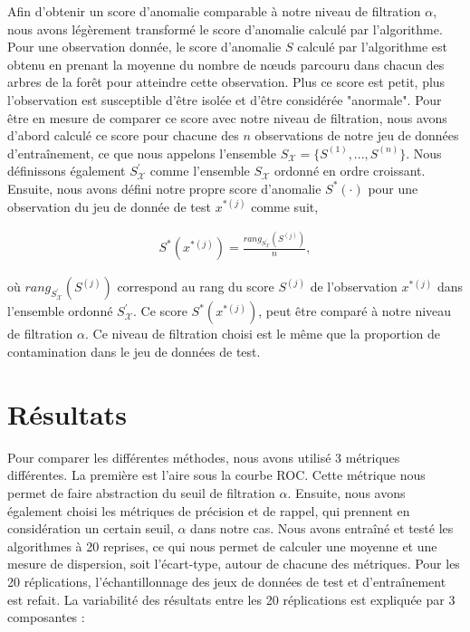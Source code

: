 Afin d'obtenir un score d'anomalie comparable à notre niveau de filtration $\alpha$, nous avons légèrement transformé le score d'anomalie calculé par l'algorithme. Pour une observation donnée, le score d'anomalie $S$  calculé par l'algorithme est obtenu en prenant la moyenne du nombre de nœuds parcouru dans chacun des arbres de la forêt pour atteindre cette observation. Plus ce score est petit, plus l'observation est susceptible d'être isolée et d'être considérée "anormale". Pour être en mesure de comparer ce score avec notre niveau de filtration, nous avons d'abord calculé ce score pour chacune des $n$ observations de notre jeu de données d'entraînement, ce que nous appelons l'ensemble $S_{\mathcal{X}} = \{S^{(1)}, ..., S^{(n)}\}$. Nous définissons également $S^{'}_{\mathcal{X}}$ comme l'ensemble $S_{\mathcal{X}}$ ordonné en ordre croissant.  Ensuite, nous avons défini notre propre score d'anomalie $S^*(\cdot)$ pour une observation du jeu de donnée de test $x^{*(j)}$ comme suit,

\begin{gather}
	S^*(x^{*(j)}) = \frac{rang_{S^{'}_{\mathcal{X}}}(S^{(j)})}{n},
\end{gather}

où $rang_{S^{'}_{\mathcal{X}}}(S^{(j)})$ correspond au rang du score $S^{(j)}$ de l'observation $x^{*(j)}$ dans l'ensemble ordonné $S^{'}_{\mathcal{X}}$. Ce score $S^*(x^{*(j)})$, peut être comparé à notre niveau de filtration $\alpha$. Ce niveau de filtration choisi est le même que la proportion de contamination dans le jeu de données de test.

\section{Résultats} \label{exp:results}

Pour comparer les différentes méthodes, nous avons utilisé 3 métriques différentes. La première est l'aire sous la courbe ROC. Cette métrique nous permet de faire abstraction du seuil de filtration $\alpha$. Ensuite, nous avons également choisi les métriques de précision et de rappel, qui prennent en considération un certain seuil, $\alpha$ dans notre cas. Nous avons entraîné et testé les algorithmes à 20 reprises, ce qui nous permet de calculer une moyenne et une mesure de dispersion, soit l'écart-type, autour de chacune des métriques. Pour les 20 réplications, l'échantillonnage des jeux de données de test et d'entraînement est refait. La variabilité des résultats entre les 20 réplications est expliquée par 3 composantes :

